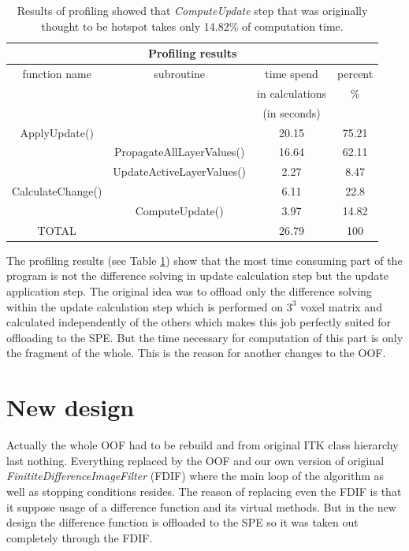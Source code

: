 \begin{table}
\centering
\begin{tabular}{|c|c|c|c|}
\hline
\multicolumn{4}{|c|}{Profiling results}\\
\hline
function name&subroutine&time spend&percent\\&&in calculations&\%\\&&(in seconds)&\\
\hline
\hline
ApplyUpdate()	&				&	20.15&	75.21\\
\hline
		&PropagateAllLayerValues()	&	16.64&	62.11\\
\hline
		&UpdateActiveLayerValues()	&	2.27&	8.47\\
\hline
CalculateChange()&				&	6.11&	22.8\\
\hline
		&ComputeUpdate()		&	3.97&	14.82\\
\hline
TOTAL		&				&	26.79&	100\\
\hline
\end{tabular}
\par
\caption[Profiling results]
{
  Results of profiling showed that \emph{ComputeUpdate} step that was originally thought to be hotspot takes only 14.82\% of computation time.
}
\label{tab:profilingresults}
\end{table}

\par
The profiling results (see Table \ref{tab:profilingresults}) show that the most time consuming part of the program is not the difference solving in update calculation step but the update application step.
The original idea was to offload only the difference solving within the update calculation step which is performed on $3^3$ voxel matrix and calculated independently of the others which makes this job perfectly suited for offloading to the SPE.
But the time necessary for computation of this part is only the fragment of the whole.
This is the reason for another changes to the OOF.

\section{New design}

\par
Actually the whole OOF had to be rebuild and from original ITK class hierarchy last nothing.
Everything replaced by the OOF and our own version of original \mbox{\emph{FinititeDifferenceImageFilter}} (FDIF) where the main loop of the algorithm as well as stopping conditions resides.
The reason of replacing even the FDIF is that it suppose usage of a difference function and its virtual methods.
But in the new design the difference function is offloaded to the SPE so it was taken out completely through the FDIF.

